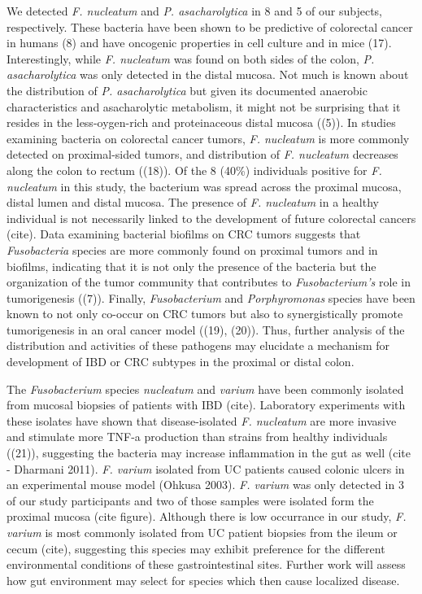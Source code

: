 \documentclass[11pt,]{article}
\begin{document}
We detected \emph{F. nucleatum} and \emph{P. asacharolytica} in 8 and 5
of our subjects, respectively. These bacteria have been shown to be
predictive of colorectal cancer in humans (8) and have oncogenic
properties in cell culture and in mice (17). Interestingly, while
\emph{F. nucleatum} was found on both sides of the colon, \emph{P.
asacharolytica} was only detected in the distal mucosa. Not much is
known about the distribution of \emph{P. asacharolytica} but given its
documented anaerobic characteristics and asacharolytic metabolism, it
might not be surprising that it resides in the less-oygen-rich and
proteinaceous distal mucosa ((5)). In studies examining bacteria on
colorectal cancer tumors, \emph{F. nucleatum} is more commonly detected
on proximal-sided tumors, and distribution of \emph{F. nucleatum}
decreases along the colon to rectum ((18)). Of the 8 (40\%) individuals
positive for \emph{F. nucleatum} in this study, the bacterium was spread
across the proximal mucosa, distal lumen and distal mucosa. The presence
of \emph{F. nucleatum} in a healthy individual is not necessarily linked
to the development of future colorectal cancers (cite). Data examining
bacterial biofilms on CRC tumors suggests that \emph{Fusobacteria}
species are more commonly found on proximal tumors and in biofilms,
indicating that it is not only the presence of the bacteria but the
organization of the tumor community that contributes to
\emph{Fusobacterium's} role in tumorigenesis ((7)). Finally,
\emph{Fusobacterium} and \emph{Porphyromonas} species have been known to
not only co-occur on CRC tumors but also to synergistically promote
tumorigenesis in an oral cancer model ((19), (20)). Thus, further
analysis of the distribution and activities of these pathogens may
elucidate a mechanism for development of IBD or CRC subtypes in the
proximal or distal colon.

The \emph{Fusobacterium} species \emph{nucleatum} and \emph{varium} have
been commonly isolated from mucosal biopsies of patients with IBD
(cite). Laboratory experiments with these isolates have shown that
disease-isolated \emph{F. nucleatum} are more invasive and stimulate
more TNF-a production than strains from healthy individuals ((21)),
suggesting the bacteria may increase inflammation in the gut as well
(cite - Dharmani 2011). \emph{F. varium} isolated from UC patients
caused colonic ulcers in an experimental mouse model (Ohkusa 2003).
\emph{F. varium} was only detected in 3 of our study participants and
two of those samples were isolated form the proximal mucosa (cite
figure). Although there is low occurrance in our study, \emph{F. varium}
is most commonly isolated from UC patient biopsies from the ileum or
cecum (cite), suggesting this species may exhibit preference for the
different environmental conditions of these gastrointestinal sites.
Further work will assess how gut environment may select for species
which then cause localized disease.
\end{document}

